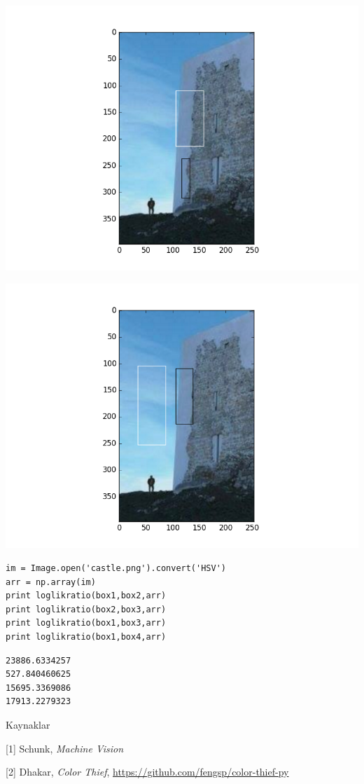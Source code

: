 \documentclass[12pt,fleqn]{article}\usepackage{../../common}
\begin{document}
\includegraphics[height=10cm]{vision_50colreg_08.png}

\includegraphics[height=10cm]{vision_50colreg_10.png}

\begin{verbatim}
im = Image.open('castle.png').convert('HSV')
arr = np.array(im)
print loglikratio(box1,box2,arr)
print loglikratio(box2,box3,arr)
print loglikratio(box1,box3,arr)
print loglikratio(box1,box4,arr)
\end{verbatim}

\begin{verbatim}
23886.6334257
527.840460625
15695.3369086
17913.2279323
\end{verbatim}

Kaynaklar

[1] Schunk, {\em Machine Vision}  

[2] Dhakar, {\em Color Thief}, \url{https://github.com/fengsp/color-thief-py}
\end{document}
